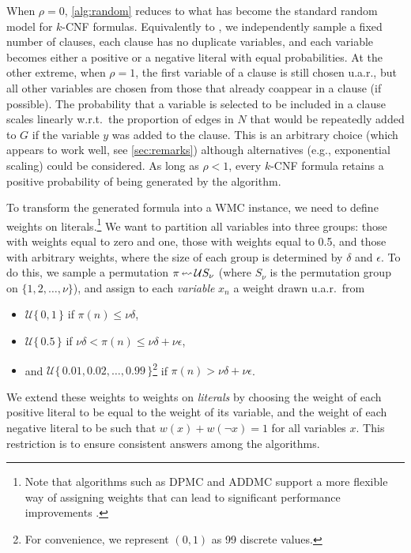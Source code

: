 When $\rho=0$, \cref{alg:random} reduces to what has become the standard random
model for $k$-CNF formulas. Equivalently to \citet{DBLP:journals/dam/FrancoP83},
we independently sample a fixed number of clauses, each clause has no duplicate
variables, and each variable becomes either a positive or a negative literal
with equal probabilities. At the other extreme, when $\rho = 1$, the first
variable of a clause is still chosen u.a.r., but all other variables are chosen
from those that already coappear in a clause (if possible). The probability that
a variable is selected to be included in a clause scales linearly w.r.t.\ the
proportion of edges in $N$ that would be repeatedly added to $G$ if the variable
$y$ was added to the clause. This is an arbitrary choice (which appears to work
well, see \cref{sec:remarks}) although alternatives (e.g., exponential scaling)
could be considered. As long as $\rho < 1$, every $k$-CNF formula retains a
positive probability of being generated by the algorithm.

To transform the generated formula into a \textsf{WMC} instance, we need
to define weights on literals.\footnote{Note that algorithms such as
  \textsc{DPMC} and
  \textsc{ADDMC} \citep{DBLP:conf/aaai/DudekPV20,DBLP:conf/cp/DudekPV20} support
  a more flexible way of assigning weights that can lead to significant
  performance improvements \citep{DBLP:conf/uai/DilkasB21,DBLP:conf/sat/DilkasB21}.} We want to partition all variables into three groups: those with weights equal to zero and one, those with weights equal to 0.5, and those with arbitrary weights, where the size of each group is determined by $\delta$ and $\epsilon$. To do this, we sample a permutation $\pi \leftlsquigarrow \mathcal{U}S_\nu$ (where $S_\nu$ is the permutation group on $\{1, 2, \dots, \nu \}$), and assign to each \emph{variable} $x_n$ a weight drawn u.a.r.\ from
\begin{itemize}
\item $\mathcal{U}\{\,0, 1\,\}$ if $\pi(n) \le \nu\delta$,
\item $\mathcal{U}\{\,0.5\,\}$ if $\nu\delta < \pi(n) \le \nu\delta +
  \nu\epsilon$,
\item and $\mathcal{U}\{\, 0.01, 0.02, \dots, 0.99 \,\}$\footnote{For
    convenience, we represent $(0, 1)$ as 99 discrete values.} if $\pi(n) >
  \nu\delta + \nu\epsilon$.
\end{itemize}
We extend these weights to weights on \emph{literals} by choosing the weight of
each positive literal to be equal to the weight of its variable, and the weight
of each negative literal to be such that $w(x) + w(\neg x) = 1$ for all
variables $x$. This restriction is to ensure consistent answers among the
algorithms.

